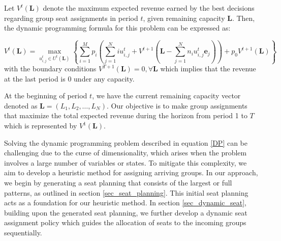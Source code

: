 Let $V^{t}(\mathbf{L})$ denote the maximum expected revenue earned by the best decisions regarding group seat assignments in period $t$, given remaining capacity $\mathbf{L}$. Then, the dynamic programming formula for this problem can be expressed as:

\begin{equation}\label{DP}
V^{t}(\mathbf{L}) = \max_{u_{i,j}^{t} \in U^{t}(\mathbf{L})}\left\{ \sum_{i=1}^{M} p_i ( \sum_{j=1}^{N} i u_{i,j}^{t} + V^{t+1}(\mathbf{L}- \sum_{j=1}^{N} n_i u_{i,j}^{t}\mathbf{e}_j)) + p_0 V^{t+1}(\mathbf{L})\right\}
\end{equation}
with the boundary conditions $V^{T+1}(\mathbf{L}) = 0, \forall \mathbf{L}$ which implies that the revenue at the last period is 0 under any capacity.

At the beginning of period $t$, we have the current remaining capacity vector denoted as $\mathbf{L} = (L_1, L_2, \ldots, L_N)$. Our objective is to make group assignments that maximize the total expected revenue during the horizon from period 1 to $T$ which is represented by $V^{1}(\mathbf{L})$.

Solving the dynamic programming problem described in equation \eqref{DP} can be challenging due to the curse of dimensionality, which arises when the problem involves a large number of variables or states. To mitigate this complexity, we aim to develop a heuristic method for assigning arriving groups. In our approach, we begin by generating a seat planning that consists of the largest or full patterns, as outlined in section \ref{sec_seat_planning}. This initial seat planning acts as a foundation for our heuristic method. In section \ref{sec_dynamic_seat}, building upon the generated seat planning, we further develop a dynamic seat assignment policy which guides the allocation of seats to the incoming groups sequentially. 










